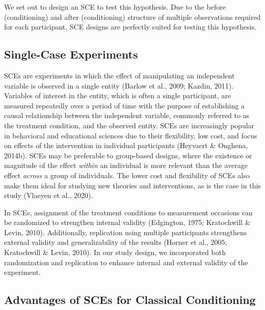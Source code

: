 \documentclass{article}
\begin{document}
We set out to design an SCE to test this hypothesis. Due to the before (conditioning) and after (conditioning) structure of multiple observations required for each participant, SCE designs are perfectly suited for testing this hypothesis.

\subsection{Single-Case Experiments}

SCEs are experiments in which the effect of manipulating an independent variable is observed in a single entity (Barlow et al., 2009; Kazdin, 2011). Variables of interest in the entity, which is often a single participant, are measured repeatedly over a period of time with the purpose of establishing a causal relationship between the independent variable, commonly referred to as the treatment condition, and the observed entity. SCEs are increasingly popular in behavioral and educational sciences due to their flexibility, low cost, and focus on effects of the intervention in individual participants (Heyvaert \& Onghena, 2014b). SCEs may be preferable to group-based designs, where the existence or magnitude of the effect \emph{within} an individual is more relevant than the average effect \emph{across} a group of individuals. The lower cost and flexibility of SCEs also make them ideal for studying new theories and interventions, as is the case in this study (Vlaeyen et al., 2020).

In SCEs, assignment of the treatment conditions to measurement occasions can be randomized to strengthen internal validity (Edgington, 1975; Kratochwill \& Levin, 2010). Additionally, replication using multiple participants strengthens external validity and generalizability of the results (Horner et al., 2005; Kratochwill \& Levin, 2010). In our study design, we incorporated both randomization and replication to enhance internal and external validity of the experiment. 

\subsection{Advantages of SCEs for Classical Conditioning}
\end{document}
